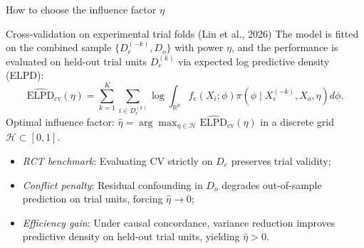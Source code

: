 \documentclass[t]{beamer}
\newcommand{\R}{\mathbb{R}}
\begin{document}
\begin{frame}{How to choose the influence factor $\eta$}
    \vspace{-0.25cm}
    \begin{block}{Cross-validation on experimental trial folds (Lin et al., 2026)}
    The model is fitted on the combined sample $\{D_e^{(-k)}, D_o\}$ with power $\eta$, and the performance is evaluated on held-out trial units $D_e^{(k)}$ via expected log predictive density (ELPD):
    \begin{equation*}
        \widehat{\text{ELPD}}_{\text{cv}}(\eta) = \sum_{k=1}^K \sum_{i \in D_e^{(k)}} \log \int_{\R^p} f_e(X_i; \phi) \pi(\phi \mid X_e^{(-k)}, X_o, \eta) d\phi.
    \end{equation*}
    Optimal influence factor: $\hat\eta = \arg\max_{\eta \in \mathcal{H}} \widehat{\text{ELPD}}_{\text{cv}}(\eta)$ in a discrete grid $\mathcal{H} \subset [0, 1]$.
    \end{block}

    \begin{itemize}
        \setlength{\itemsep}{0.04cm}
        \item \emph{RCT benchmark}: Evaluating CV strictly on $D_e$ preserves trial validity;
        \item \emph{Conflict penalty}: Residual confounding in $D_o$ degrades out-of-sample prediction on trial units, forcing $\hat\eta \to 0$;
        \item \emph{Efficiency gain}: Under causal concordance, variance reduction improves predictive density on held-out trial units, yielding $\hat\eta > 0$.
    \end{itemize}
\end{frame}
\end{document}
